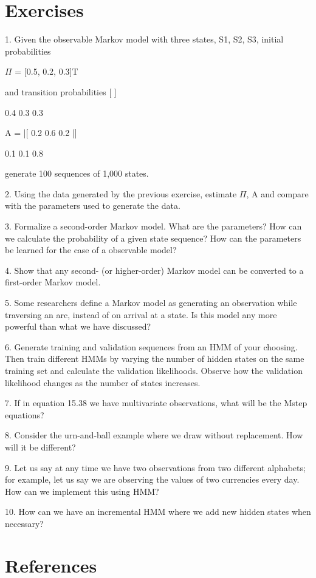 \section{Exercises}

1. Given the observable Markov model with three states, S1, S2, S3, initial probabilities

$\Pi$ = [0.5, 0.2, 0.3]T

and transition probabilities [ ]

0.4 0.3 0.3

A = |[ 0.2 0.6 0.2 |]

0.1 0.1 0.8

generate 100 sequences of 1,000 states.

2. Using the data generated by the previous exercise, estimate $\Pi$, A and compare with the parameters used to generate the data.

3. Formalize a second-order Markov model. What are the parameters? How can we calculate the probability of a given state sequence? How can the parameters be learned for the case of a observable model?

4. Show that any second- (or higher-order) Markov model can be converted to a first-order Markov model.

5. Some researchers define a Markov model as generating an observation while traversing an arc, instead of on arrival at a state. Is this model any more powerful than what we have discussed?

6. Generate training and validation sequences from an HMM of your choosing. Then train different HMMs by varying the number of hidden states on the same training set and calculate the validation likelihoods. Observe how the validation likelihood changes as the number of states increases.

7. If in equation 15.38 we have multivariate observations, what will be the Mstep equations?

8. Consider the urn-and-ball example where we draw without replacement. How will it be different?

9. Let us say at any time we have two observations from two different alphabets; for example, let us say we are observing the values of two currencies every day. How can we implement this using HMM?

10. How can we have an incremental HMM where we add new hidden states when necessary?

\section{References}

